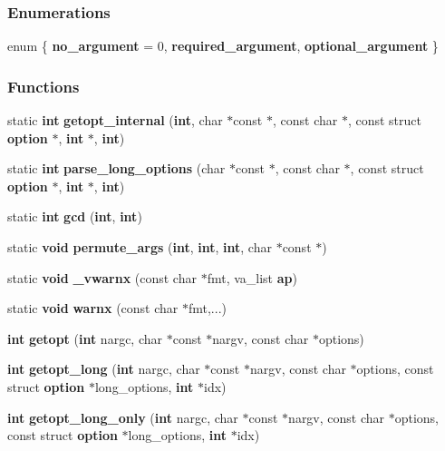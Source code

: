 \subsubsection*{Enumerations}
\begin{DoxyCompactItemize}
\item 
enum \{ {\bf no\+\_\+argument} = 0, 
{\bf required\+\_\+argument}, 
{\bf optional\+\_\+argument}
 \}
\end{DoxyCompactItemize}
\subsubsection*{Functions}
\begin{DoxyCompactItemize}
\item 
static {\bf int} {\bf getopt\+\_\+internal} ({\bf int}, char $\ast$const $\ast$, const char $\ast$, const struct {\bf option} $\ast$, {\bf int} $\ast$, {\bf int})
\item 
static {\bf int} {\bf parse\+\_\+long\+\_\+options} (char $\ast$const $\ast$, const char $\ast$, const struct {\bf option} $\ast$, {\bf int} $\ast$, {\bf int})
\item 
static {\bf int} {\bf gcd} ({\bf int}, {\bf int})
\item 
static {\bf void} {\bf permute\+\_\+args} ({\bf int}, {\bf int}, {\bf int}, char $\ast$const $\ast$)
\item 
static {\bf void} {\bf \+\_\+vwarnx} (const char $\ast$fmt, va\+\_\+list {\bf ap})
\item 
static {\bf void} {\bf warnx} (const char $\ast$fmt,...)
\item 
{\bf int} {\bf getopt} ({\bf int} nargc, char $\ast$const $\ast$nargv, const char $\ast$options)
\item 
{\bf int} {\bf getopt\+\_\+long} ({\bf int} nargc, char $\ast$const $\ast$nargv, const char $\ast$options, const struct {\bf option} $\ast$long\+\_\+options, {\bf int} $\ast$idx)
\item 
{\bf int} {\bf getopt\+\_\+long\+\_\+only} ({\bf int} nargc, char $\ast$const $\ast$nargv, const char $\ast$options, const struct {\bf option} $\ast$long\+\_\+options, {\bf int} $\ast$idx)
\end{DoxyCompactItemize}
